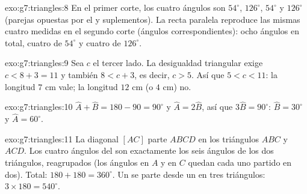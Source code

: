 \begin{solution}{exo:g7:triangles:8}
En el primer corte, los cuatro ángulos son $54^\circ$, $126^\circ$,
$54^\circ$ y $126^\circ$ (parejas opuestas por el  y suplementos).
La recta paralela reproduce las mismas cuatro medidas en el segundo
corte (ángulos correspondientes): ocho ángulos en total, cuatro de
$54^\circ$ y cuatro de $126^\circ$.
\end{solution}

\begin{solution}{exo:g7:triangles:9}
Sea $c$ el tercer lado. La desigualdad triangular exige
$c < 8 + 3 = 11$ y también $8 < c + 3$, es decir, $c > 5$. Así que
$5 < c < 11$: la longitud $7$ cm vale; la longitud $12$ cm (o $4$ cm)
no.
\end{solution}

\begin{solution}{exo:g7:triangles:10}
$\widehat A + \widehat B = 180 - 90 = 90^\circ$ y
$\widehat A = 2\widehat B$, así que $3\widehat B = 90^\circ$:
$\widehat B = 30^\circ$ y $\widehat A = 60^\circ$.
\end{solution}

\begin{solution}{exo:g7:triangles:11}
La diagonal $[AC]$ parte $ABCD$ en los triángulos $ABC$ y $ACD$.
Los cuatro ángulos del  son exactamente los seis ángulos de
los dos triángulos, reagrupados (los ángulos en $A$ y en $C$ quedan cada uno
partido en dos). Total: $180 + 180 = 360^\circ$. Un  se parte desde
un  en tres triángulos: $3 \times 180 = 540^\circ$.
\end{solution}

